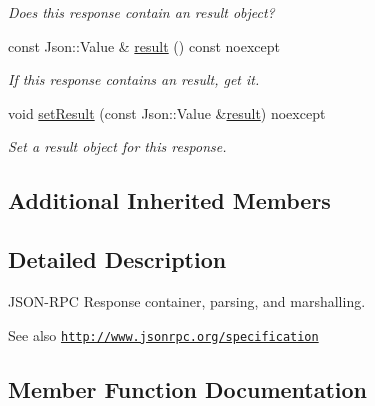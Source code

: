 \begin{DoxyCompactItemize}
\begin{DoxyCompactList}\small\item\em Does this response contain an result object? \end{DoxyCompactList}\item 
const Json\+::\+Value \& \hyperlink{group___network_module_gaff7247fb07139f7e6f620020f3a00224}{result} () const noexcept
\begin{DoxyCompactList}\small\item\em If this response contains an result, get it. \end{DoxyCompactList}\item 
void \hyperlink{group___network_module_ga70614bdc02d6aeca557c21644305a72a}{set\+Result} (const Json\+::\+Value \&\hyperlink{group___network_module_gaff7247fb07139f7e6f620020f3a00224}{result}) noexcept
\begin{DoxyCompactList}\small\item\em Set a result object for this response. \end{DoxyCompactList}\end{DoxyCompactItemize}
\subsection*{Additional Inherited Members}


\subsection{Detailed Description}
J\+S\+O\+N-\/\+R\+PC Response container, parsing, and marshalling. 

\begin{DoxySeeAlso}{See also}
\href{http://www.jsonrpc.org/specification}{\tt http\+://www.\+jsonrpc.\+org/specification} 
\end{DoxySeeAlso}


\subsection{Member Function Documentation}
